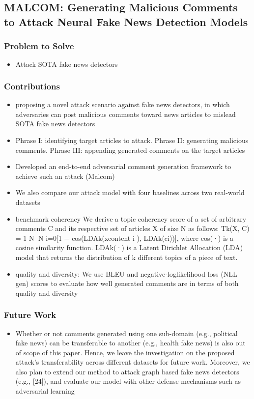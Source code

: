 \documentclass{article}
\begin{document}
\begin{flushleft}


\subsection{MALCOM: Generating Malicious Comments to Attack Neural Fake News Detection Models  \cite{le2020malcom} }
\subsubsection*{Problem to Solve}
\begin{itemize}
    \item Attack SOTA fake news detectors 
\end{itemize}

\subsubsection*{Contributions}
\begin{itemize}
  \item proposing a novel attack scenario against fake news detectors, in which adversaries can post malicious comments toward news articles to mislead SOTA fake news detectors
  \item Phrase I: identifying target articles to attack. Phrase II: generating malicious comments. Phrase III: appending generated
comments on the target articles
  \item Developed an end-to-end adversarial comment generation framework to achieve such an attack (Malcom)
  \item We also compare our attack model with four baselines across two real-world datasets
  \item benchmark coherency We derive a topic coherency score of a set of arbitrary comments C and its respective set of
articles X of size N as follows: Tk(X, C) = 1 N N i=0[1 − cos(LDAk(xcontent i ), LDAk(ci))], where cos(·) is a cosine similarity function. LDAk(·) is a Latent Dirichlet Allocation (LDA) model that returns the distribution of
k different topics of a piece of text.
\item quality and diversity: We use BLEU and negative-loglikelihood loss (NLL gen) scores to evaluate how well
generated comments are in terms of both quality and diversity 
\end{itemize}

\subsubsection*{Future Work}
\begin{itemize}
  \item Whether or not comments generated using one sub-domain (e.g., political fake news) can be transferable to another (e.g., health fake news) is also out of scope of this paper. Hence, we leave the investigation on the proposed attack’s transferability across different datasets for future work. Moreover, we also plan to extend our method to attack graph based fake news detectors (e.g., [24]), and evaluate our model
with other defense mechanisms such as adversarial learning
\end{itemize}


\end{flushleft}
\end{document}

